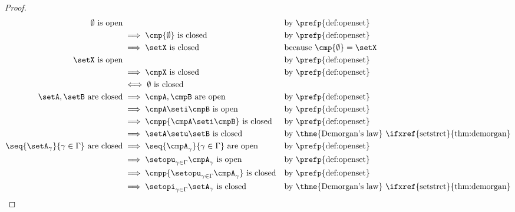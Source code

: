 \begin{proof}
\begin{align*}
  \emptyset \text{ is open}
    &
    &&        \text{by \prefp{def:openset}}
  \\&\implies \cmp{\emptyset} \text{ is closed}
    &&        \text{by \prefp{def:openset}}
  \\&\implies \setX \text{ is closed}
    && \text{because $\cmp{\emptyset}=\setX$}
  \\
  \setX \text{ is open}
    &
    &&        \text{by \prefp{def:openset}}
  \\&\implies \cmpX \text{ is closed}
    &&        \text{by \prefp{def:openset}}
  \\&\iff     \emptyset \text{ is closed}
  \\
  \setA,\setB \text{ are closed}
    &\implies \cmpA,\cmpB \text{ are open}
    &&        \text{by \prefp{def:openset}}
  \\&\implies \cmpA \seti \cmpB \text{ is open}
    &&        \text{by \prefp{def:openset}}
  \\&\implies \cmpp{\cmpA \seti \cmpB} \text{ is closed}
    &&        \text{by \prefp{def:openset}}
  \\&\implies \setA\setu\setB \text{ is closed}
    &&        \text{by \thme{Demorgan's law} \ifxref{setstrct}{thm:demorgan}}
  \\
  \seq{\setA_\gamma}{\gamma\in\Gamma} \text{ are closed}
    &\implies \seq{\cmpA_\gamma}{\gamma\in\Gamma} \text{ are open}
    &&        \text{by \prefp{def:openset}}
  \\&\implies \setopu_{\gamma\in\Gamma}\cmpA_\gamma \text{ is open}
    &&        \text{by \prefp{def:openset}}
  \\&\implies \cmpp{\setopu_{\gamma\in\Gamma}\cmpA_\gamma} \text{ is closed}
    &&        \text{by \prefp{def:openset}}
  \\&\implies \setopi_{\gamma\in\Gamma}\setA_\gamma \text{ is closed}
    &&        \text{by \thme{Demorgan's law} \ifxref{setstrct}{thm:demorgan}}
\end{align*}
\end{proof}


